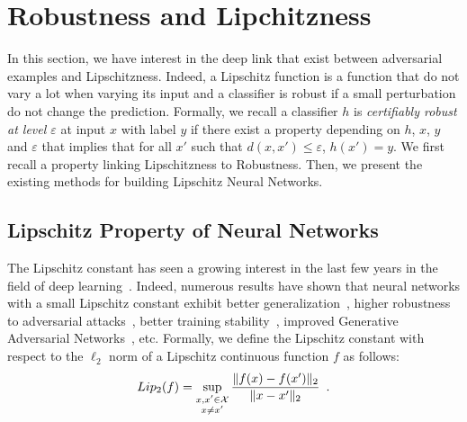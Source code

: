 \section{Robustness and Lipchitzness}

In this section, we have interest in the deep link that exist between adversarial examples and Lipschitzness. Indeed, a Lipschitz function is a function that do not vary a lot when varying its input and a classifier is robust if a small perturbation do not change the prediction. Formally, we recall a classifier $h$ is \emph{certifiably robust at level $\varepsilon$} at input $x$ with label $y$ if there exist a property depending on $h$, $x$, $y$ and $\varepsilon$ that implies that for all $x'$ such that $d(x,x')\leq\varepsilon$, $h(x') = y$. We first recall a property linking  Lipschitzness to Robustness. Then, we present the existing methods for building Lipschitz Neural Networks. 




\subsection{Lipschitz Property of Neural Networks}


The Lipschitz constant has seen a growing interest in the last few years in the field of deep learning~\citep{scaman2018lipschitz,fazlyab2019efficient,combettes2020lipschitz,bethune2021many}.
Indeed, numerous results have shown that neural networks with a small Lipschitz constant exhibit better generalization~\citep{bartlett2017spectrally}, higher robustness to adversarial attacks~\citep{Szegedy2013IntriguingPO,farnia2018generalizable,tsuzuku2018lipschitz}, better training stability~\citep{xiao2018dynamical,trockman2021orthogonalizing}, improved Generative Adversarial Networks~\citep{arjovsky2017wasserstein}, etc.
Formally, we define the Lipschitz constant with respect to the $\ell_2$ norm of a Lipschitz continuous function $f$ as follows:
\begin{equation*}
  Lip_{2}{(f)} = \sup_{\substack{x, x' \in \mathcal{X} \\ x \neq x'}} \frac{\lVert f(x) - f(x') \rVert_2}{\lVert x - x' \rVert_2} \enspace.
\end{equation*}

